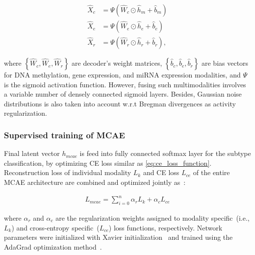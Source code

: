 \begin{equation}
    \begin{aligned}
        \hat{X}_{c} &=\Psi\left(\hat W_{c} \odot \hat{h}_{m}+\hat{b}_{m}\right) \\
        \hat{X}_{e} &=\Psi\left(\hat W_{e} \odot \hat{h}_{e}+\hat{b}_{e}\right) \\
        \hat{X}_{r} &=\Psi\left(\hat W_{r} \odot \hat{h}_{r}+\hat{b}_{r}\right),
        \end{aligned}
\end{equation}

\hspace*{3.5mm} where $\left\{\hat W_{c}, \hat W_{e}, \hat W_{r}\right\}$ are decoder's weight matrices, $\left\{\hat b_{c}, \hat b_{e}, \hat b_{r}\right\}$ are bias vectors for DNA methylation, gene expression, and miRNA expression modalities, and $\Psi$ is the sigmoid activation function. However, fusing such multimodalities involves a variable number of densely connected sigmoid layers. Besides, Gaussian noise distributions is also taken into account w.r.t Bregman divergences as activity regularization. 

\subsubsection{Supervised training of MCAE}
Final latent vector $h_{mcae}$ is feed into fully connected softmax layer for the subtype classification, by optimizing CE loss similar as \cref{eq:ce_loss_function}. 
Reconstruction loss of individual modality ${L}_{k}$ and CE loss ${L}_{ce}$ of the entire MCAE architecture are combined and optimized jointly as~\cite{mmdcae}: 

\begin{align}
    L_{mcae}=\sum_{i=0}^{n} \alpha_{r} {L}_{k}+\alpha_{c} {L}_{ce}
\end{align}

\hspace*{3.5mm} where $\alpha_{r}$ and $\alpha_{c}$ are the regularization weights assigned to modality specific~(i.e., ${L}_{k}$) and cross-entropy specific~(${L}_{ce}$) loss functions, respectively. Network parameters were initialized with Xavier initialization~\cite{xavier} and trained using the AdaGrad optimization method~\cite{duchi2011adaptive}. 

